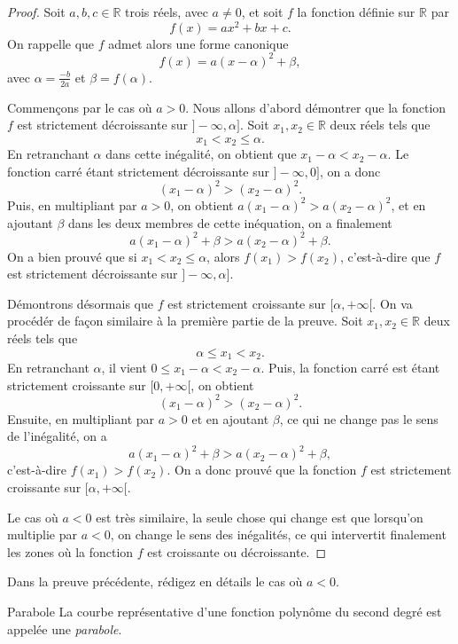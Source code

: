 \documentclass[11pt]{article}
\begin{document}
\begin{proof}
  Soit $a, b, c\in\mathbb{R}$ trois réels, avec $a\neq0$, et soit $f$ la
  fonction définie sur $\mathbb{R}$ par
  \[
    f(x) = ax^2 + bx + c.
  \]
  On rappelle que $f$ admet alors une forme canonique
  \[
    f(x) = a(x-\alpha)^2+\beta,
  \]
  avec $\alpha=\frac{-b}{2a}$ et $\beta=f(\alpha)$.

  Commençons par le cas où $a>0$. Nous allons d'abord démontrer que la fonction $f$ est
  strictement décroissante sur $]-\infty, \alpha]$. Soit $x_1, x_2\in\mathbb{R}$
  deux réels tels que 
  \[
    x_1 < x_2 \leq \alpha.
  \]
  En retranchant $\alpha$ dans cette inégalité, on obtient que
  $x_1-\alpha<x_2-\alpha$. Le fonction carré étant strictement décroissante sur
  $]-\infty, 0]$, on a donc
  \[
    (x_1-\alpha)^2 > (x_2-\alpha)^2.
  \]
  Puis, en multipliant par $a>0$, on obtient $a(x_1-\alpha)^2>a(x_2-\alpha)^2$,
  et en ajoutant $\beta$ dans les deux membres de cette inéquation, on a
  finalement
  \[
    a(x_1-\alpha)^2+\beta > a(x_2-\alpha)^2+\beta.
  \]
  On a bien prouvé que si $x_1<x_2\leq \alpha$, alors $f(x_1)>f(x_2)$,
  c'est-à-dire que $f$ est strictement décroissante sur $]-\infty, \alpha]$.

  Démontrons désormais que $f$ est strictement croissante sur $[\alpha,
  +\infty[$. On va procédér de façon similaire à la première partie de la
    preuve. Soit $x_1, x_2\in\mathbb{R}$ deux réels tels que
  \[
    \alpha\leq x_1 < x_2.
  \]
  En retranchant $\alpha$, il vient $0\leq x_1-\alpha < x_2-\alpha$. Puis, la
  fonction carré est étant strictement croissante sur $[0, +\infty[$, on obtient
  \[
    (x_1-\alpha)^2 > (x_2-\alpha)^2.
  \]
  Ensuite, en multipliant par $a>0$ et en ajoutant $\beta$, ce qui ne change pas
  le sens de l'inégalité, on a
  \[
    a(x_1-\alpha)^2+\beta > a(x_2-\alpha)^2+\beta,
  \]
  c'est-à-dire $f(x_1)>f(x_2)$. On a donc prouvé que la fonction $f$ est
  strictement croissante sur $[\alpha, +\infty[$.

  Le cas où $a<0$ est très similaire, la seule chose qui change est que lorsqu'on
  multiplie par $a<0$, on change le sens des inégalités, ce qui intervertit 
  finalement les zones où la fonction $f$ est croissante ou décroissante.
\end{proof}

\begin{exo}
  Dans la preuve précédente, rédigez en détails le cas où $a<0$.
\end{exo}

\begin{defi}{Parabole}
  La courbe représentative d'une fonction polynôme du second degré est appelée
  une \emph{parabole}.
\end{defi}
\end{document}
